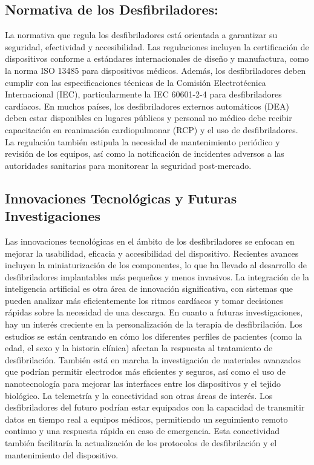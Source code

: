 \subsection{Normativa de los Desfibriladores:}

La normativa que regula los desfibriladores está orientada a garantizar su seguridad, efectividad y accesibilidad. Las regulaciones incluyen la certificación de dispositivos conforme a estándares internacionales de diseño y manufactura, como la norma ISO 13485 para dispositivos médicos. Además, los desfibriladores deben cumplir con las especificaciones técnicas de la Comisión Electrotécnica Internacional (IEC), particularmente la IEC 60601-2-4 para desfibriladores cardíacos. En muchos países, los desfibriladores externos automáticos (DEA) deben estar disponibles en lugares públicos y personal no médico debe recibir capacitación en reanimación cardiopulmonar (RCP) y el uso de desfibriladores. La regulación también estipula la necesidad de mantenimiento periódico y revisión de los equipos, así como la notificación de incidentes adversos a las autoridades sanitarias para monitorear la seguridad post-mercado.

\subsection{Innovaciones Tecnológicas y Futuras Investigaciones}

Las innovaciones tecnológicas en el ámbito de los desfibriladores se enfocan en mejorar la usabilidad, eficacia y accesibilidad del dispositivo. Recientes avances incluyen la miniaturización de los componentes, lo que ha llevado al desarrollo de desfibriladores implantables más pequeños y menos invasivos. La integración de la inteligencia artificial es otra área de innovación significativa, con sistemas que pueden analizar más eficientemente los ritmos cardíacos y tomar decisiones rápidas sobre la necesidad de una descarga.\newline \hfill \break
En cuanto a futuras investigaciones, hay un interés creciente en la personalización de la terapia de desfibrilación. Los estudios se están centrando en cómo los diferentes perfiles de pacientes (como la edad, el sexo y la historia clínica) afectan la respuesta al tratamiento de desfibrilación. También está en marcha la investigación de materiales avanzados que podrían permitir electrodos más eficientes y seguros, así como el uso de nanotecnología para mejorar las interfaces entre los dispositivos y el tejido biológico.\newline \hfill \break
La telemetría y la conectividad son otras áreas de interés. Los desfibriladores del futuro podrían estar equipados con la capacidad de transmitir datos en tiempo real a equipos médicos, permitiendo un seguimiento remoto continuo y una respuesta rápida en caso de emergencia. Esta conectividad también facilitaría la actualización de los protocolos de desfibrilación y el mantenimiento del dispositivo.

